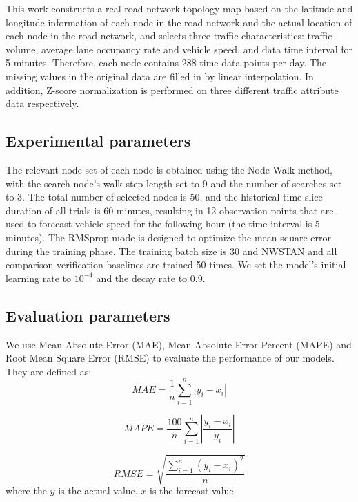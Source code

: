 \documentclass[conference]{IEEEtran}
\begin{document}
\par
This work constructs a real road network topology map based on the latitude and longitude information of each node in the road network and the actual location of each node in the road network, and selects three traffic characteristics: traffic volume, average lane occupancy rate and vehicle speed, and data time interval for 5 minutes. Therefore, each node contains 288 time data points per day. The missing values in the original data are filled in by linear interpolation. In addition, Z-score normalization is performed on three different traffic attribute data respectively.



\subsection{Experimental parameters}
\par
The relevant node set of each node is obtained using the Node-Walk method, with the search node's walk step length set to 9 and the number of searches set to 3. The total number of selected nodes is 50, and the historical time slice duration of all trials is 60 minutes, resulting in 12 observation points that are used to forecast vehicle speed for the following hour (the time interval is 5 minutes). The RMSprop mode is designed to optimize the mean square error during the training phase. The training batch size is 30 and NWSTAN and all comparison verification baselines are trained 50 times. We set the model's initial learning rate to $10^{-4}$ and the decay rate to 0.9.

\subsection{Evaluation parameters}
\par
We use Mean Absolute Error (MAE), Mean Absolute Error Percent (MAPE) and Root Mean Square Error (RMSE) to evaluate the performance of our models. They are defined as:
\begin{equation}
    MAE = \frac{1}{n}{\sum_{i = 1}^{n}{\left|y_i - x_i\right|}}  
\end{equation}

\begin{equation}
    MAPE = \frac{100}{n}{\sum_{i = 1}^{n}{\left|{\frac{y_i - x_i}{y_i}}\right|}}
\end{equation}

\begin{equation}
    RMSE = \sqrt{\frac{\sum_{i = 1}^{n}{{\left(y_i - x_i\right)}^2}}{n}} 
\end{equation}    
where the $y$ is the actual value. $x$ is the forecast value.
\end{document}
